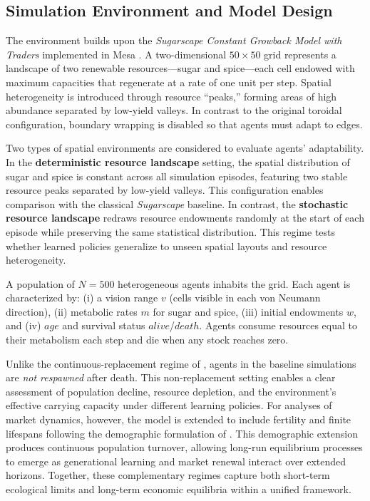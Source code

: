 \documentclass[pdflatex,sn-mathphys-num]{sn-jnl}%
\theoremstyle{thmstyleone}%
\theoremstyle{thmstyletwo}%
\theoremstyle{thmstylethree}%
\begin{document}
\subsection{Simulation Environment and Model Design}
The environment builds upon the \textit{Sugarscape Constant Growback Model with Traders} implemented in Mesa \citep{Mesa2025}.  
A two-dimensional \(50\times50\) grid represents a landscape of two renewable resources—sugar and spice—each cell endowed with maximum capacities that regenerate at a rate of one unit per step.  
Spatial heterogeneity is introduced through resource ``peaks,'' forming areas of high abundance separated by low-yield valleys.  
In contrast to the original toroidal configuration, boundary wrapping is disabled so that agents must adapt to edges.

Two types of spatial environments are considered to evaluate agents' adaptability.  
In the \textbf{deterministic resource landscape} setting, the spatial distribution of sugar and spice is constant across all simulation episodes, featuring two stable resource peaks separated by low-yield valleys.  
This configuration enables comparison with the classical \textit{Sugarscape} baseline.  
In contrast, the \textbf{stochastic resource landscape} redraws resource endowments randomly at the start of each episode while preserving the same statistical distribution.  
This regime tests whether learned policies generalize to unseen spatial layouts and resource heterogeneity.

A population of \(N=500\) heterogeneous agents inhabits the grid.  
Each agent is characterized by:  
(i) a vision range \(v\) (cells visible in each von Neumann direction),  
(ii) metabolic rates \(m\) for sugar and spice,  
(iii) initial endowments \(w\), and
(iv) \(age\) and survival status \(alive\)/\(death\).  
Agents consume resources equal to their metabolism each step and die when any stock reaches zero.  

Unlike the continuous-replacement regime of \citet{EpsteinAxtell1996}, agents in the baseline simulations are \textit{not respawned} after death.  
This non-replacement setting enables a clear assessment of population decline, resource depletion, and the environment’s effective carrying capacity under different learning policies.
For analyses of market dynamics, however, the model is extended to include fertility and finite lifespans following the demographic formulation of \citet{EpsteinAxtell1996}.  
This demographic extension produces continuous population turnover, allowing long-run equilibrium processes to emerge as generational learning and market renewal interact over extended horizons.  
Together, these complementary regimes capture both short-term ecological limits and long-term economic equilibria within a unified framework.
\end{document}
